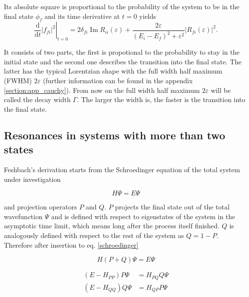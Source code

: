 Its absolute square is proportional to the probability of the system to be
in the final state $\phi_f$ and its time derivative at $t=0$ yields
\begin{equation}
  \left . \frac{\mathrm{d}}{\mathrm{d}t} |f_{fi}|^2 \right |_{t=0}
  = 2\delta_{fi} \operatorname{Im}R_{ii}(\varepsilon) 
    + \frac{2\varepsilon}{(E_i-E_f)^2+\varepsilon^2} |R_{fi}(\varepsilon)|^2 .
\end{equation}

It consists of two parts, the first is propotional to the probability to stay
in the initial state and the second one describes the transition into the
final state. The latter has the typical Lorentzian shape with the full width
half maximum
(FWHM) $2 \varepsilon$ (further information can be found in the appendix
\ref{section:app_cauchy}). From now on
the full width half maximum ${2\varepsilon}$ will be called the
decay width $\Gamma$.
The larger the width is, the faster is the transition into the final state.





\subsection{Resonances in systems with more than two states}

Feshbach's derivation starts from the Schroedinger equation of the total
system under investigation

\begin{equation}
  H \Psi = E \Psi \label{schroedinger}
\end{equation}

and projection operators $P$ and $Q$. $P$ projects the final state out
of the total wavefunction $\Psi$ and is defined with respect to eigenstates
of the system in the asymptotic time limit, which means long after the process
itself finished. $Q$ is analogously defined with respect to the rest of the
system as $Q = 1 - P$. Therefore after insertion to eq. \ref{schroedinger}

\begin{equation}
  H (P+Q) \Psi = E \Psi
\end{equation}

\begin{align}
  (E - H_{PP}) P \Psi & = H_{PQ} Q \Psi \label{se_PP}\\
  (E - H_{QQ}) Q \Psi & = H_{QP} P \Psi \label{se_QQ}
\end{align}

